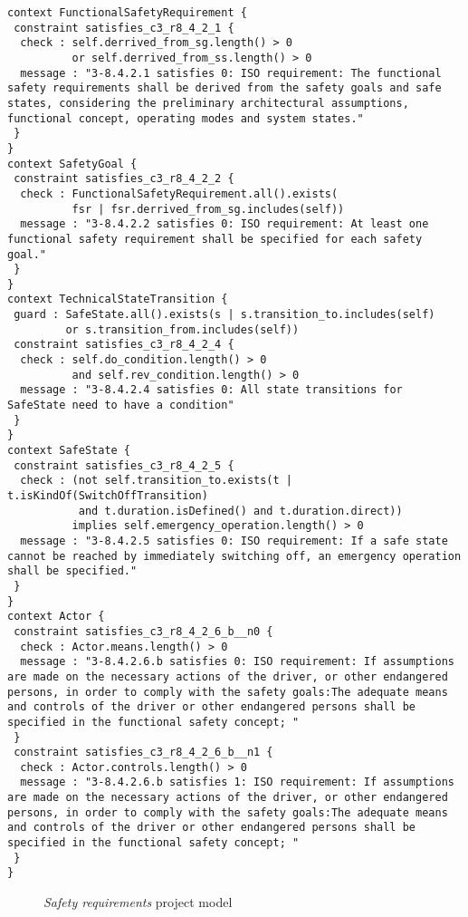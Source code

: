 \documentclass[a4paper]{article}
\begin{document}
\begin{lstlisting}
context FunctionalSafetyRequirement {
 constraint satisfies_c3_r8_4_2_1 {
  check : self.derrived_from_sg.length() > 0
          or self.derrived_from_ss.length() > 0
  message : "3-8.4.2.1 satisfies 0: ISO requirement: The functional safety requirements shall be derived from the safety goals and safe states, considering the preliminary architectural assumptions, functional concept, operating modes and system states."
 }
}
context SafetyGoal {
 constraint satisfies_c3_r8_4_2_2 {
  check : FunctionalSafetyRequirement.all().exists(
          fsr | fsr.derrived_from_sg.includes(self))
  message : "3-8.4.2.2 satisfies 0: ISO requirement: At least one functional safety requirement shall be specified for each safety goal."
 }
}
context TechnicalStateTransition {
 guard : SafeState.all().exists(s | s.transition_to.includes(self)
         or s.transition_from.includes(self))
 constraint satisfies_c3_r8_4_2_4 {
  check : self.do_condition.length() > 0
          and self.rev_condition.length() > 0
  message : "3-8.4.2.4 satisfies 0: All state transitions for SafeState need to have a condition"
 }
}
context SafeState {
 constraint satisfies_c3_r8_4_2_5 {
  check : (not self.transition_to.exists(t | t.isKindOf(SwitchOffTransition)
           and t.duration.isDefined() and t.duration.direct))
          implies self.emergency_operation.length() > 0
  message : "3-8.4.2.5 satisfies 0: ISO requirement: If a safe state cannot be reached by immediately switching off, an emergency operation shall be specified."
 }
}
context Actor {
 constraint satisfies_c3_r8_4_2_6_b__n0 {
  check : Actor.means.length() > 0
  message : "3-8.4.2.6.b satisfies 0: ISO requirement: If assumptions are made on the necessary actions of the driver, or other endangered persons, in order to comply with the safety goals:The adequate means and controls of the driver or other endangered persons shall be specified in the functional safety concept; "
 }
 constraint satisfies_c3_r8_4_2_6_b__n1 {
  check : Actor.controls.length() > 0
  message : "3-8.4.2.6.b satisfies 1: ISO requirement: If assumptions are made on the necessary actions of the driver, or other endangered persons, in order to comply with the safety goals:The adequate means and controls of the driver or other endangered persons shall be specified in the functional safety concept; "
 }
}

\end{lstlisting}
\newpage
\begin{figure}[h!]\centering
	\caption{\textit{Safety requirements} project model} \label{fig:Safety requirements project model}
\end{figure}
\end{document}
